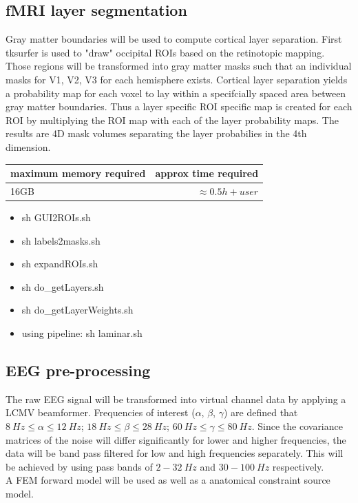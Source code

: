 \documentclass[12pt,a4paper]{scrartcl}
\begin{document}
\subsection{fMRI layer segmentation}
Gray matter boundaries will be used to compute cortical layer separation. First tksurfer is used to "draw" occipital ROIs based on the retinotopic mapping. Those regions will be transformed into gray matter masks such that an individual masks for V1, V2, V3 for each hemisphere exists. Cortical layer separation yields a probability map for each voxel to lay within a specifcially spaced area between gray matter boundaries. Thus a layer specific ROI specific map is created for each ROI by multiplying the ROI map with each of the layer probability maps. The results are 4D mask volumes separating the layer probabilies in the 4th dimension.
\begin{table}[h]
\begin{tabular}{l | r}
\toprule
maximum memory required & approx time required\\\toprule
16GB & $\approx 0.5h+user$ \\\bottomrule
\end{tabular}
\end{table}
\begin{itemize}
\item sh GUI2ROIs.sh
\item sh labels2masks.sh
\item sh expandROIs.sh
\item sh do\_getLayers.sh
\item sh do\_getLayerWeights.sh
\item using pipeline: sh laminar.sh
\end{itemize}

\subsection{EEG pre-processing}
The raw EEG signal will be transformed into virtual channel data by applying a LCMV beamformer. Frequencies of interest ($\alpha$, $\beta$, $\gamma$) are defined that $8~Hz \leq \alpha \leq 12~Hz$; $18~Hz \leq \beta \leq 28~Hz$; $60~Hz \leq \gamma \leq 80~Hz$. Since the covariance matrices of the noise will differ significantly for lower and higher frequencies, the data will be band pass filtered for low and high frequencies separately. This will be achieved by using pass bands of $2-32~Hz$ and $30-100~Hz$ respectively.\\
A FEM forward model will be used as well as a anatomical constraint source model.\\
\end{document}
